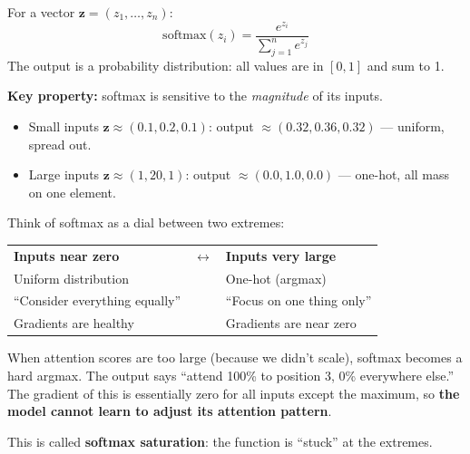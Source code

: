 \documentclass[11pt, a4paper]{article}
\begin{document}
\begin{formaldef}
For a vector $\bm{z} = (z_1, \ldots, z_n)$:
\[
\text{softmax}(z_i) = \frac{e^{z_i}}{\sum_{j=1}^{n} e^{z_j}}
\]
The output is a probability distribution: all values are in $[0, 1]$ and sum to 1.

\medskip
\noindent \textbf{Key property:} softmax is sensitive to the \emph{magnitude} of its inputs.
\begin{itemize}
\item Small inputs $\bm{z} \approx (0.1, 0.2, 0.1)$: output $\approx (0.32, 0.36, 0.32)$ --- uniform, spread out.
\item Large inputs $\bm{z} \approx (1, 20, 1)$: output $\approx (0.0, 1.0, 0.0)$ --- one-hot, all mass on one element.
\end{itemize}
\end{formaldef}

\begin{intuition}
Think of softmax as a dial between two extremes:

\begin{center}
\begin{tabular}{lcl}
\textbf{Inputs near zero} & $\longleftrightarrow$ & \textbf{Inputs very large} \\
Uniform distribution &  & One-hot (argmax) \\
``Consider everything equally'' &  & ``Focus on one thing only'' \\
Gradients are healthy &  & Gradients are near zero \\
\end{tabular}
\end{center}

When attention scores are too large (because we didn't scale), softmax becomes
a hard argmax. The output says ``attend 100\% to position 3, 0\% everywhere else.''
The gradient of this is essentially zero for all inputs except the maximum, so
\textbf{the model cannot learn to adjust its attention pattern}.

\medskip
\noindent This is called \textbf{softmax saturation}: the function is ``stuck'' at the extremes.
\end{intuition}
\end{document}
